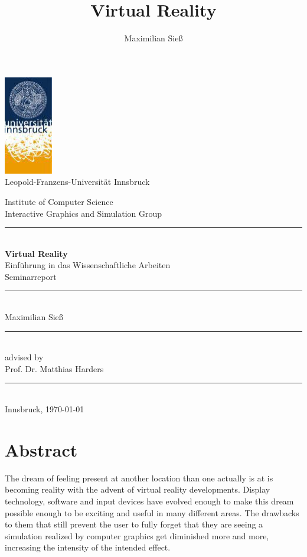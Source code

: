 \documentclass[11pt]{article}
\newcommand{\whitespace}{\rule{\linewidth}{0.0mm}}
\begin{document}
\title{Virtual Reality}
\author{Maximilian Sieß}

\begin{titlepage}
	\begin{center}
		\includegraphics[scale=1]{images/uibk} \\
		Leopold-Franzens-Universität Innsbruck
		\linebreak 

		Institute of Computer Science \\
		Interactive Graphics and Simulation Group
	
		\whitespace \\[3.0cm]
		\LARGE \textbf{Virtual Reality}\\
		\normalsize Einführung in das Wissenschaftliche Arbeiten\\
		Seminarreport
	
		\whitespace \\[1.8cm]
		Maximilian Sieß
		
		\whitespace \\[3.0cm]
		advised by\\
		Prof. Dr. Matthias Harders
		
		\whitespace \\[5.0cm]
		Innsbruck, \today

	\end{center}
\end{titlepage}




\newpage
\section{Abstract}
The dream of feeling present at another location than one actually is at is becoming reality with the advent of virtual reality developments. Display technology, software and input devices have evolved enough to make this dream possible enough to be exciting and useful in many different areas. The drawbacks to them that still prevent the user to fully forget that they are seeing a simulation realized by computer graphics get diminished more and more, increasing the intensity of the intended effect.
\end{document}
